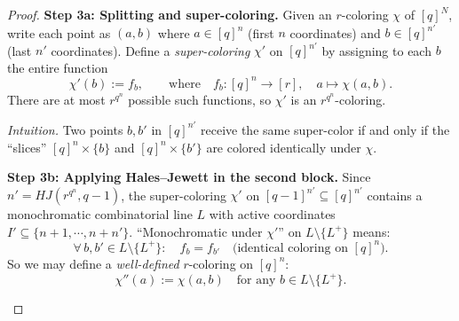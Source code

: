 \documentclass[11pt, a4paper]{ctexrep}
\begin{document}
\begin{proof}
    \medskip
    \noindent\textbf{Step 3a: Splitting and super-coloring.}
    Given an $r$-coloring $\chi$ of $[q]^N$, write each point as $(a,b)$ where $a\in [q]^n$ (first $n$ coordinates) and $b\in [q]^{n'}$ (last $n'$ coordinates). Define a \emph{super-coloring} $\chi'$ on $[q]^{n'}$ by assigning to each $b$ the entire function
    \[
        \chi'(b) := f_b, \qquad\text{where}\quad f_b\colon [q]^n\to [r],\quad a\mapsto \chi(a,b).
    \]
    There are at most $r^{q^n}$ possible such functions, so $\chi'$ is an $r^{q^n}$-coloring.

    \smallskip\noindent
    \textit{Intuition.} Two points $b,b'$ in $[q]^{n'}$ receive the same super-color if and only if the ``slices'' $[q]^n\times\{b\}$ and $[q]^n\times\{b'\}$ are colored identically under $\chi$.

    \medskip
    \noindent\textbf{Step 3b: Applying Hales--Jewett in the second block.}
    Since $n'=HJ(r^{q^n},q-1)$, the super-coloring $\chi'$ on $[q-1]^{n'}\subseteq [q]^{n'}$ contains a monochromatic combinatorial line $L$ with active coordinates $I'\subseteq \{n{+}1,\cdots,n{+}n'\}$. ``Monochromatic under $\chi'$'' on $L\setminus\{L^+\}$ means:
    \[
        \forall\, b,b'\in L\setminus\{L^+\}:\quad f_b = f_{b'} \quad\text{(identical coloring on $[q]^n$)}.
    \]
    So we may define a \emph{well-defined} $r$-coloring on $[q]^n$:
    \[
        \chi''(a) := \chi(a,b) \quad\text{for any } b\in L\setminus\{L^+\}.
    \]

    \begin{center}
    \end{center}


\end{proof}
\end{document}
